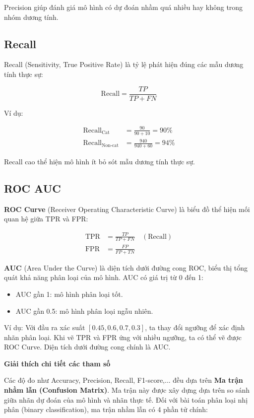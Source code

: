 Precision giúp đánh giá mô hình có dự đoán nhầm quá nhiều hay không trong nhóm dương tính.

\subsection {Recall}
\label{eval:prec}
Recall (Sensitivity, True Positive Rate) là tỷ lệ phát hiện đúng các mẫu dương tính thực sự:

\begin{equation}
\text{Recall} = \frac{TP}{TP + FN}
\end{equation}

Ví dụ:

\begin{align*}
\text{Recall}_{\text{Cat}} &= \frac{90}{90 + 10} = 90\% \\
\text{Recall}_{\text{Non-cat}} &= \frac{940}{940 + 60} = 94\%
\end{align*}

Recall cao thể hiện mô hình ít bỏ sót mẫu dương tính thực sự.

\subsection {ROC AUC}
\label{eval:rocauc}
\textbf{ROC Curve} (Receiver Operating Characteristic Curve) là biểu đồ thể hiện mối quan hệ giữa TPR và FPR:

\begin{align}
\text{TPR} &= \frac{TP}{TP + FN} \quad (\text{Recall}) \\
\text{FPR} &= \frac{FP}{FP + TN}
\end{align}

\textbf{AUC} (Area Under the Curve) là diện tích dưới đường cong ROC, biểu thị tổng quát khả năng phân loại của mô hình. AUC có giá trị từ 0 đến 1:
\begin{itemize}
    \item AUC gần 1: mô hình phân loại tốt.
    \item AUC gần 0.5: mô hình phân loại ngẫu nhiên.
\end{itemize}

Ví dụ: Với đầu ra xác suất $[0.45, 0.6, 0.7, 0.3]$, ta thay đổi ngưỡng để xác định nhãn phân loại. Khi vẽ TPR và FPR ứng với nhiều ngưỡng, ta có thể vẽ được ROC Curve. Diện tích dưới đường cong chính là AUC.

\textbf{Giải thích chi tiết các tham số}

Các độ đo như Accuracy, Precision, Recall, F1-score,... đều dựa trên \textbf{Ma trận nhầm lẫn (Confusion Matrix)}. Ma trận này được xây dựng dựa trên so sánh giữa nhãn dự đoán của mô hình và nhãn thực tế. Đối với bài toán phân loại nhị phân (binary classification), ma trận nhầm lẫn có 4 phần tử chính:


